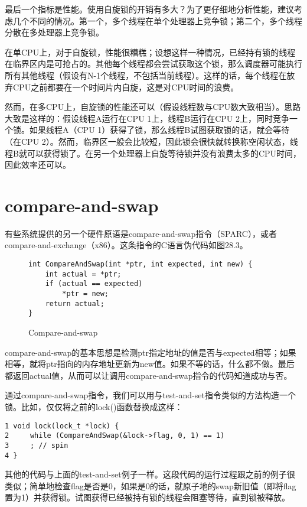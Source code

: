 最后一个指标是性能。使用自旋锁的开销有多大？为了更仔细地分析性能，建议考虑几个不同的情况。第一个，多个线程在单个处理器上竞争锁；第二个，多个线程分散在多处理器上竞争锁。

在单CPU上，对于自旋锁，性能很糟糕；设想这样一种情况，已经持有锁的线程在临界区内是可抢占的。其他每个线程都会尝试获取这个锁，那么调度器可能执行所有其他线程（假设有N-1个线程，不包括当前线程）。这样的话，每个线程在放弃CPU之前都要在一个时间片内自旋，这是对CPU时间的浪费。

然而，在多CPU上，自旋锁的性能还可以（假设线程数与CPU数大致相当）。思路大致是这样的：假设线程A运行在CPU 1上，线程B运行在CPU 2上，同时竞争一个锁。如果线程A（CPU 1）获得了锁，那么线程B试图获取锁的话，就会等待（在CPU 2）。然而，临界区一般会比较短，因此锁会很快就转换称空闲状态，线程B就可以获得锁了。在另一个处理器上自旋等待锁并没有浪费太多的CPU时间，因此效率还可以。


\section{compare-and-swap}
有些系统提供的另一个硬件原语是compare-and-swap指令（SPARC），或者compare-and-exchange（x86）。这条指令的C语言伪代码如图28.3。

\begin{figure}[h]

\begin{lstlisting}
int CompareAndSwap(int *ptr, int expected, int new) {
    int actual = *ptr;
    if (actual == expected)
        *ptr = new;
    return actual;
}
\end{lstlisting}
\caption{Compare-and-swap}
\end{figure}

compare-and-swap的基本思想是检测ptr指定地址的值是否与expected相等；如果相等，就将ptr指向的内存地址更新为new值。如果不等的话，什么都不做。最后都返回actual值，从而可以让调用compare-and-swap指令的代码知道成功与否。

通过compare-and-swap指令，我们可以用与test-and-set指令类似的方法构造一个锁。比如，仅仅将之前的lock()函数替换成这样：

\begin{verbatim}
1 void lock(lock_t *lock) {
2     while (CompareAndSwap(&lock->flag, 0, 1) == 1)
3     ; // spin
4 }
\end{verbatim}

其他的代码与上面的test-and-set例子一样。这段代码的运行过程跟之前的例子很类似；简单地检查flag是否是0，如果是0的话，就原子地的swap新旧值（即将flag置为1）并获得锁。试图获得已经被持有锁的线程会阻塞等待，直到锁被释放。


